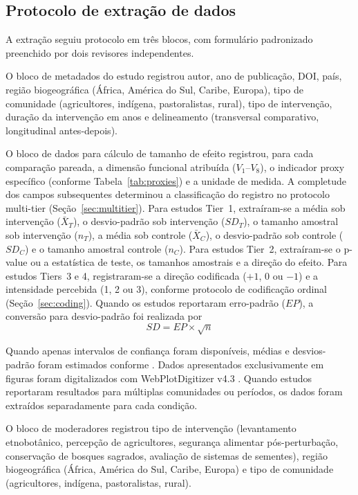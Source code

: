 \documentclass[12pt,a4paper]{article}
\begin{document}
\subsection{Protocolo de extração de dados}
\label{sec:extraction}

A extração seguiu protocolo em três blocos, com formulário padronizado preenchido por dois revisores independentes.

O bloco de metadados do estudo registrou autor, ano de publicação, DOI, país, região biogeográfica (África, América do Sul, Caribe, Europa), tipo de comunidade (agricultores, indígena, pastoralistas, rural), tipo de intervenção, duração da intervenção em anos e delineamento (transversal comparativo, longitudinal antes-depois).

O bloco de dados para cálculo de tamanho de efeito registrou, para cada comparação pareada, a dimensão funcional atribuída ($V_1$--$V_8$), o indicador proxy específico (conforme Tabela~\ref{tab:proxies}) e a unidade de medida. A completude dos campos subsequentes determinou a classificação do registro no protocolo multi-tier (Seção~\ref{sec:multitier}). Para estudos Tier~1, extraíram-se a média sob intervenção ($\bar{X}_T$), o desvio-padrão sob intervenção ($SD_T$), o tamanho amostral sob intervenção ($n_T$), a média sob controle ($\bar{X}_C$), o desvio-padrão sob controle ($SD_C$) e o tamanho amostral controle ($n_C$). Para estudos Tier~2, extraíram-se o p-value ou a estatística de teste, os tamanhos amostrais e a direção do efeito. Para estudos Tiers~3 e 4, registraram-se a direção codificada ($+1$, $0$ ou $-1$) e a intensidade percebida (1, 2 ou 3), conforme protocolo de codificação ordinal (Seção~\ref{sec:coding}). Quando os estudos reportaram erro-padrão ($EP$), a conversão para desvio-padrão foi realizada por
%
\begin{equation}
SD = EP \times \sqrt{n}
\label{eq:sd-ep}
\end{equation}

\noindent Quando apenas intervalos de confiança foram disponíveis, médias e desvios-padrão foram estimados conforme \citet{Betancur2022}. Dados apresentados exclusivamente em figuras foram digitalizados com WebPlotDigitizer v4.3 \citep{Rohatgi2020}. Quando estudos reportaram resultados para múltiplas comunidades ou períodos, os dados foram extraídos separadamente para cada condição.

O bloco de moderadores registrou tipo de intervenção (levantamento etnobotânico, percepção de agricultores, segurança alimentar pós-perturbação, conservação de bosques sagrados, avaliação de sistemas de sementes), região biogeográfica (África, América do Sul, Caribe, Europa) e tipo de comunidade (agricultores, indígena, pastoralistas, rural).
\end{document}
